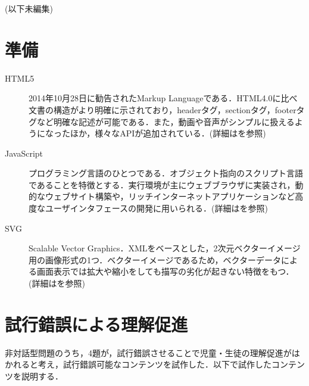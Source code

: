 \documentclass[a4paper]{jarticle}
\begin{document}
\begin{multicols}{2}
(以下未編集)\\

\section{準備}

\begin{description}
\item[HTML5]  2014年10月28日に勧告されたMarkup Languageである．HTML4.0に比べ文書の構造がより明確に示されており，headerタグ，sectionタグ，footerタグなど明確な記述が可能である．また，動画や音声がシンプルに扱えるようになったほか，様々なAPIが追加されている．(詳細は\cite{html5}を参照)
\item[JavaScript] プログラミング言語のひとつである．オブジェクト指向のスクリプト言語であることを特徴とする．実行環境が主にウェブブラウザに実装され，動的なウェブサイト構築や，リッチインターネットアプリケーションなど高度なユーザインタフェースの開発に用いられる．(詳細は\cite{javascript}を参照)
\item[SVG] Scalable Vector Graphics．XMLをベースとした，2次元ベクターイメージ用の画像形式の1つ．ベクターイメージであるため，ベクターデータによる画面表示では拡大や縮小をしても描写の劣化が起きない特徴をもつ．(詳細は\cite{svg}を参照)
\end{description}

\section{試行錯誤による理解促進}
非対話型問題のうち，4題が，試行錯誤させることで児童・生徒の理解促進がはかれると考え，試行錯誤可能なコンテンツを試作した．以下で試作したコンテンツを説明する．


\end{multicols}
\end{document}
